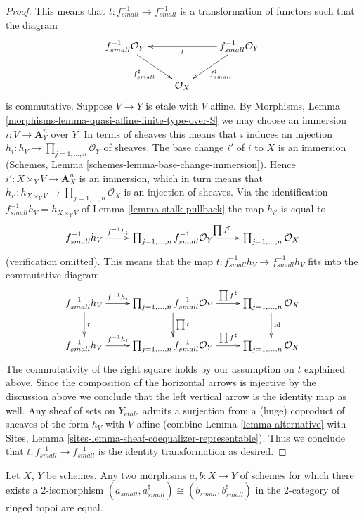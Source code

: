 \begin{proof}
This means that $t : f^{-1}_{small} \to f^{-1}_{small}$
is a transformation of functors such that the diagram
$$
\xymatrix{
f_{small}^{-1}\mathcal{O}_Y
\ar[rd]_{f_{small}^\sharp}  & &
f_{small}^{-1}\mathcal{O}_Y \ar[ll]^t \ar[ld]^{f_{small}^\sharp} \\
& \mathcal{O}_X
}
$$
is commutative. Suppose $V \to Y$ is etale with $V$ affine. By
Morphisms, Lemma \ref{morphisms-lemma-quasi-affine-finite-type-over-S}
we may choose an immersion $i : V \to \mathbf{A}^n_Y$ over $Y$.
In terms of sheaves this means that $i$ induces an injection
$h_i : h_V \to \prod_{j = 1, \ldots, n} \mathcal{O}_Y$ of sheaves.
The base change $i'$ of $i$ to $X$ is an immersion
(Schemes, Lemma \ref{schemes-lemma-base-change-immersion}).
Hence $i' : X \times_Y V \to \mathbf{A}^n_X$ is an immersion, which
in turn means that
$h_{i'} : h_{X \times_Y V} \to \prod_{j = 1, \ldots, n} \mathcal{O}_X$
is an injection of sheaves.
Via the identification $f_{small}^{-1}h_V = h_{X \times_Y V}$ of
Lemma \ref{lemma-stalk-pullback}
the map $h_{i'}$ is equal to
$$
\xymatrix{
f_{small}^{-1}h_V \ar[r]^-{f^{-1}h_i} &
\prod_{j = 1, \ldots, n} f_{small}^{-1}\mathcal{O}_Y
\ar[r]^{\prod f^\sharp} &
\prod_{j = 1, \ldots, n} \mathcal{O}_X
}
$$
(verification omitted). This means that the map
$t : f_{small}^{-1}h_V \to f_{small}^{-1}h_V$
fits into the commutative diagram
$$
\xymatrix{
f_{small}^{-1}h_V \ar[r]^-{f^{-1}h_i} \ar[d]^t &
\prod_{j = 1, \ldots, n} f_{small}^{-1}\mathcal{O}_Y
\ar[r]^-{\prod f^\sharp} \ar[d]^{\prod t} &
\prod_{j = 1, \ldots, n} \mathcal{O}_X \ar[d]^{\text{id}}\\
f_{small}^{-1}h_V \ar[r]^-{f^{-1}h_i} &
\prod_{j = 1, \ldots, n} f_{small}^{-1}\mathcal{O}_Y
\ar[r]^-{\prod f^\sharp} &
\prod_{j = 1, \ldots, n} \mathcal{O}_X
}
$$
The commutativity of the right square holds by our assumption on $t$
explained above.
Since the composition of the horizontal arrows is injective
by the discussion above we conclude that the left vertical arrow
is the identity map as well. Any sheaf of sets on
$Y_{etale}$ admits a surjection from a (huge) coproduct of sheaves
of the form $h_V$ with $V$ affine (combine
Lemma \ref{lemma-alternative}
with
Sites, Lemma \ref{sites-lemma-sheaf-coequalizer-representable}).
Thus we conclude that $t : f_{small}^{-1} \to f_{small}^{-1}$
is the identity transformation as desired.
\end{proof}

\begin{lemma}
\label{lemma-faithful}
Let $X$, $Y$ be schemes.
Any two morphisms $a, b : X \to Y$ of schemes
for which there exists a $2$-isomorphism
$(a_{small}, a_{small}^\sharp) \cong (b_{small}, b_{small}^\sharp)$
in the $2$-category of ringed topoi are equal.
\end{lemma}

